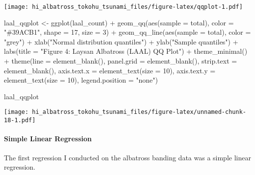 \documentclass[
]{article}
\newenvironment{Shaded}{\begin{snugshade}}{\end{snugshade}}
\newcommand{\AttributeTok}[1]{\textcolor[rgb]{0.77,0.63,0.00}{#1}}
\newcommand{\DecValTok}[1]{\textcolor[rgb]{0.00,0.00,0.81}{#1}}
\newcommand{\FunctionTok}[1]{\textcolor[rgb]{0.00,0.00,0.00}{#1}}
\newcommand{\NormalTok}[1]{#1}
\newcommand{\OtherTok}[1]{\textcolor[rgb]{0.56,0.35,0.01}{#1}}
\newcommand{\SpecialCharTok}[1]{\textcolor[rgb]{0.00,0.00,0.00}{#1}}
\newcommand{\StringTok}[1]{\textcolor[rgb]{0.31,0.60,0.02}{#1}}
\begin{document}
\texttt{[image: hi\_albatross\_tokohu\_tsunami\_files/figure-latex/qqplot-1.pdf]}

\begin{Shaded}
\begin{Highlighting}[]
\NormalTok{laal\_qqplot }\OtherTok{\textless{}{-}} \FunctionTok{ggplot}\NormalTok{(laal\_count) }\SpecialCharTok{+}
  \FunctionTok{geom\_qq}\NormalTok{(}\FunctionTok{aes}\NormalTok{(}\AttributeTok{sample =}\NormalTok{ total),}
          \AttributeTok{color =} \StringTok{"\#39ACB1"}\NormalTok{,}
          \AttributeTok{shape =} \DecValTok{17}\NormalTok{,}
          \AttributeTok{size =} \DecValTok{3}\NormalTok{) }\SpecialCharTok{+}
  \FunctionTok{geom\_qq\_line}\NormalTok{(}\FunctionTok{aes}\NormalTok{(}\AttributeTok{sample =}\NormalTok{ total),}
            \AttributeTok{color =} \StringTok{"grey"}\NormalTok{) }\SpecialCharTok{+}
  \FunctionTok{xlab}\NormalTok{(}\StringTok{"Normal distribution quantiles"}\NormalTok{) }\SpecialCharTok{+}
  \FunctionTok{ylab}\NormalTok{(}\StringTok{"Sample quantiles"}\NormalTok{) }\SpecialCharTok{+}
  \FunctionTok{labs}\NormalTok{(}\AttributeTok{title =} \StringTok{"Figure 4: Laysan Albatross (LAAL) QQ Plot"}\NormalTok{) }\SpecialCharTok{+}
  \FunctionTok{theme\_minimal}\NormalTok{() }\SpecialCharTok{+}
  \FunctionTok{theme}\NormalTok{(}\AttributeTok{line =} \FunctionTok{element\_blank}\NormalTok{(),}
        \AttributeTok{panel.grid =} \FunctionTok{element\_blank}\NormalTok{(),}
        \AttributeTok{strip.text =} \FunctionTok{element\_blank}\NormalTok{(),}
        \AttributeTok{axis.text.x =} \FunctionTok{element\_text}\NormalTok{(}\AttributeTok{size =} \DecValTok{10}\NormalTok{),}
        \AttributeTok{axis.text.y =} \FunctionTok{element\_text}\NormalTok{(}\AttributeTok{size =} \DecValTok{10}\NormalTok{),}
        \AttributeTok{legend.position =} \StringTok{"none"}\NormalTok{)}

\NormalTok{laal\_qqplot }
\end{Highlighting}
\end{Shaded}

\texttt{[image: hi\_albatross\_tokohu\_tsunami\_files/figure-latex/unnamed-chunk-18-1.pdf]}

\hypertarget{simple-linear-regression}{%
\paragraph{Simple Linear Regression}\label{simple-linear-regression}}

The first regression I conducted on the albatross banding data was a
simple linear regression.
\end{document}
